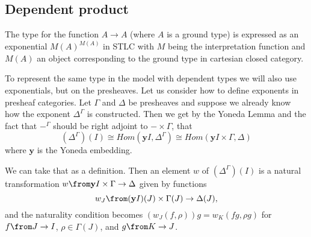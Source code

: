 \subsection*{Dependent product}

\begin{example}
  The type for the function $A \to A$ (where $A$ is a ground type) is expressed
  as an exponential $M(A)^{M(A)}$ in STLC with $M$ being the interpretation
  function and $M(A)$ an object corresponding to the ground type in cartesian
  closed category.
\end{example}

To represent the same type in the model with dependent types we will also use
exponentials, but on the presheaves. Let us consider how to define exponents in
presheaf categories. Let $\Gamma$ and $\Delta$ be presheaves and suppose we
already know how the exponent $\Delta^\Gamma$ is constructed. Then we get by
the Yoneda Lemma and the fact that $-^\Gamma$ should be right adjoint to $-
\times \Gamma$, that
\[
  (\Delta^\Gamma)(I) \cong Hom(\mathbf{y}I, \Delta^\Gamma) \cong Hom(\mathbf{y}I \times \Gamma, \Delta)
\]
where $\mathbf{y}$ is the Yoneda embedding.

We can take that as a definition. Then an element $w$ of $(\Delta^\Gamma)(I)$
is a natural transformation $w \from \mathbf{y}I\times \Gamma \to \Delta$ given
by functions
\[
  w_J \from (\mathbf{y}I)(J) \times \Gamma(J) \to \Delta(J),
\]
and the naturality condition becomes $(w_J(f, \rho))g = w_K(fg, \rho g)$ for $f
\from J \to I$, $\rho \in \Gamma(J)$, and $g \from K \to J$.

